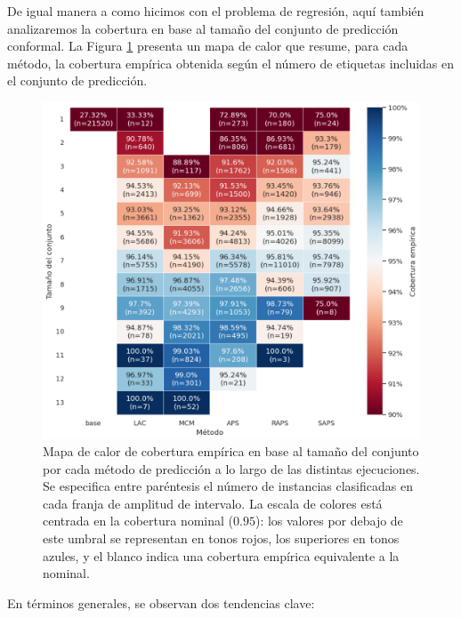 De igual manera a como hicimos con el problema de regresión, aquí también analizaremos la cobertura en base al tamaño del conjunto de predicción conformal. 
La Figura \ref{fig:AGC_coverage_by_PSS} presenta un mapa de calor que resume, para cada método, la cobertura empírica obtenida según el número de etiquetas incluidas en el conjunto de predicción.

\begin{figure}[htbp]
    \centering
    \includegraphics[width=\textwidth]{capitulos/cap_05/imagenes/AGC_coverage_by_PSS.png}
    \caption[
        Mapa de calor de cobertura empírica en base al tamaño del conjunto por cada método de predicción a lo largo de las distintas ejecuciones.
    ]{
        Mapa de calor de cobertura empírica en base al tamaño del conjunto por cada método de predicción a lo largo de las distintas ejecuciones. 
        Se especifica entre paréntesis el número de instancias clasificadas en cada franja de amplitud de intervalo.
        La escala de colores está centrada en la cobertura nominal ($0.95$): los valores por debajo de este umbral se representan en tonos rojos, los superiores en tonos azules, y el blanco indica una cobertura empírica equivalente a la nominal.
    }
    \label{fig:AGC_coverage_by_PSS}
\end{figure}

En términos generales, se observan dos tendencias clave:


